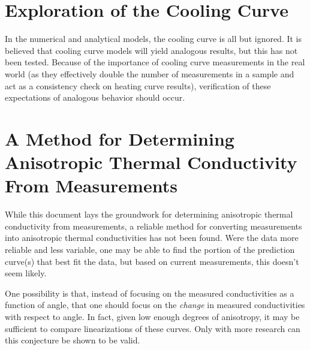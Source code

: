 \section{Exploration of the Cooling Curve}

In the numerical and analytical models, the cooling curve is all but ignored. It
is believed that cooling curve models will yield analogous results, but this has
not been tested. Because of the importance of cooling curve measurements in the
real world (as they effectively double the number of measurements in a sample
and act as a consistency check on heating curve results),
verification of these expectations of analogous behavior should occur.

\section{A Method for Determining Anisotropic Thermal Conductivity From Measurements}

While this document lays the groundwork for determining anisotropic thermal
conductivity from measurements, a reliable method for converting measurements
into anisotropic thermal conductivities has not been found. Were the data
more reliable and less variable, one may be able to find the portion of the
prediction curve(s) that best fit the data, but based on current measurements,
this doesn't seem likely.

One possibility is that, instead of focusing on the measured conductivities as a
function of angle, that one should focus on the \emph{change} in measured
conductivities with respect to angle. In fact, given low enough degrees of
anisotropy, it may be sufficient to compare linearizations of these curves. Only
with more research can this conjecture be shown to be valid.
